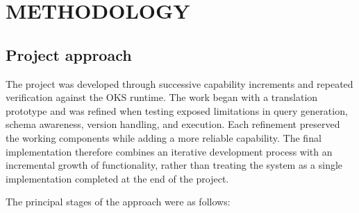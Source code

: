 \documentclass[12pt, a4paper]{report}
\begin{document}
\chapter{METHODOLOGY}

\section{Project approach}
The project was developed through successive capability increments and repeated
verification against the OKS runtime. The work began with a translation
prototype and was refined when testing exposed limitations in query generation,
schema awareness, version handling, and execution. Each refinement preserved
the working components while adding a more reliable capability. The final
implementation therefore combines an iterative development process with an
incremental growth of functionality, rather than treating the system as a
single implementation completed at the end of the project.

The principal stages of the approach were as follows:
\end{document}
